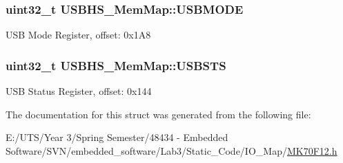 \subsubsection[{U\+S\+B\+M\+O\+D\+E}]{\setlength{\rightskip}{0pt plus 5cm}uint32\+\_\+t U\+S\+B\+H\+S\+\_\+\+Mem\+Map\+::\+U\+S\+B\+M\+O\+D\+E}\label{struct_u_s_b_h_s___mem_map_afe4ec3963906653c83890dea008fac84}
U\+S\+B Mode Register, offset\+: 0x1\+A8 \hypertarget{struct_u_s_b_h_s___mem_map_ab651a6e6b81d8e4f97a9637833cc45b2}{}
\subsubsection[{U\+S\+B\+S\+T\+S}]{\setlength{\rightskip}{0pt plus 5cm}uint32\+\_\+t U\+S\+B\+H\+S\+\_\+\+Mem\+Map\+::\+U\+S\+B\+S\+T\+S}\label{struct_u_s_b_h_s___mem_map_ab651a6e6b81d8e4f97a9637833cc45b2}
U\+S\+B Status Register, offset\+: 0x144 

The documentation for this struct was generated from the following file\+:\begin{DoxyCompactItemize}
\item 
E\+:/\+U\+T\+S/\+Year 3/\+Spring Semester/48434 -\/ Embedded Software/\+S\+V\+N/embedded\+\_\+software/\+Lab3/\+Static\+\_\+\+Code/\+I\+O\+\_\+\+Map/\hyperlink{_m_k70_f12_8h}{M\+K70\+F12.\+h}\end{DoxyCompactItemize}
